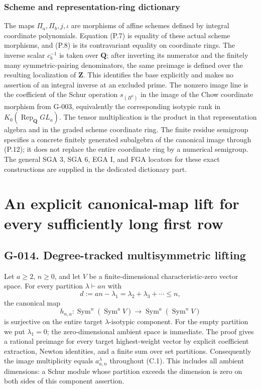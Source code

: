 \documentclass[
  10pt,
]{article}
\begin{document}
\subsubsection{Scheme and representation-ring
dictionary}\label{scheme-and-representation-ring-dictionary}

The maps \(\Pi_a,\Pi_b,j,\iota\) are morphisms of affine schemes defined
by integral coordinate polynomials. Equation (P.7) is equality of these
actual scheme morphisms, and (P.8) is its contravariant equality on
coordinate rings. The inverse scalar \(c_b^{-1}\) is taken over
\(\mathbf Q\); after inverting its numerator and the finitely many
symmetric-pairing denominators, the same preimage is defined over the
resulting localization of \(\mathbf Z\). This identifies the base
explicitly and makes no assertion of an integral inverse at an excluded
prime. The nonzero image line is the coefficient of the Schur operation
\(s_{(B^a)}\) in the image of the Chow coordinate morphism from G-003,
equivalently the corresponding isotypic rank in
\(K_0(\operatorname{Rep}_{\mathbf Q}GL_a)\). The tensor multiplication
is the product in that representation algebra and in the graded scheme
coordinate ring. The finite residue semigroup specifies a concrete
finitely generated subalgebra of the canonical image through (P.12); it
does not replace the entire coordinate ring by a numerical semigroup.
The general SGA 3, SGA 6, EGA I, and FGA locators for these exact
constructions are supplied in the dedicated dictionary part.

\section{An explicit canonical-map lift for every sufficiently long
first
row}\label{an-explicit-canonical-map-lift-for-every-sufficiently-long-first-row}

\subsection{G-014. Degree-tracked multisymmetric
lifting}\label{g-014.-degree-tracked-multisymmetric-lifting}

Let \(a\ge2\), \(n\ge0\), and let \(V\) be a finite-dimensional
characteristic-zero vector space. For every partition
\(\lambda\vdash an\) with \[
 d:=an-\lambda_1=\lambda_2+\lambda_3+\cdots\le n,
\tag{C.1}
\] the canonical map \[
 h_{n,a}:\operatorname{Sym}^n(\operatorname{Sym}^a V)
 \longrightarrow\operatorname{Sym}^a(\operatorname{Sym}^n V)
\tag{C.2}
\] is surjective on the entire target \(\lambda\)-isotypic component.
For the empty partition we put \(\lambda_1=0\); the zero-dimensional
ambient space is immediate. The proof gives a rational preimage for
every target highest-weight vector by explicit coefficient extraction,
Newton identities, and a finite sum over set partitions. Consequently
the image multiplicity equals \(a_{a,n}^{\lambda}\) throughout (C.1).
This includes all ambient dimensions: a Schur module whose partition
exceeds the dimension is zero on both sides of this component assertion.
\end{document}
